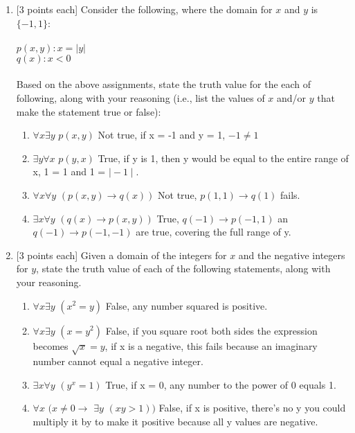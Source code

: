 \documentclass[11pt]{article}
\begin{document}
\begin{enumerate}
\vskip 0.5cm
\item {[3 points each]}  Consider the following, where the domain for $x$ and $y$ is $\{-1, 1\}$:\\
\\ \hspace*{2cm} $p(x,y): x = |y|$
\\ \hspace*{2cm} $q(x): x < 0$ \\
\\ Based on the above assignments, state the truth value for the each of following, along with your reasoning 
(i.e., list the values of $x$ and/or $y$ that make the statement true or false):
\begin{enumerate}[label=\alph*.]
\itemsep-0mm
\item $\forall x \exists y$ $p(x, y)$ Not true, if x = -1 and y = 1, $-1 \neq 1$
\item $\exists y \forall x$ $p(y, x)$ True, if y is 1, then y would be equal to the entire range of x, 1 = 1 and 1 = $\mid -1 \mid$.
\item $\forall x \forall y$ $(p(x, y) \rightarrow q(x))$ Not true, $p(1,1) \rightarrow q(1) $ fails.
\item $\exists x \forall y$ $(q(x) \rightarrow p(x, y))$ True, $q(-1) \rightarrow p(-1,1) $ an$q(-1) \rightarrow p(-1,-1) $ are true, covering the full range of y.
\end{enumerate}

\vskip 0.5cm
\item {[3 points each]}  Given a domain of the integers for $x$ and the negative integers for $y$, 
state the truth value of each of the following statements, along with your reasoning.

\begin{enumerate}[label=\alph*.]
\itemsep-0mm
\item $\forall x \exists y$ $(x^2 = y)$ False, any number squared is positive. 
\item $\forall x \exists y$ $(x = y^2)$ False, if you square root both sides the expression becomes $\sqrt{x} = y$, if x is a negative, this fails because an imaginary number cannot equal a negative integer.
\item $\exists x \forall y$ $(y^x = 1)$ True, if x = 0, any number to the power of 0 equals 1.
\item $\forall x$ $(x \neq 0 \rightarrow$ $\exists y$ $(xy > 1))$ False, if x is positive, there's no y you could multiply it by to make it positive because all y values are negative. 
\end{enumerate}


\end{enumerate}
\end{document}
